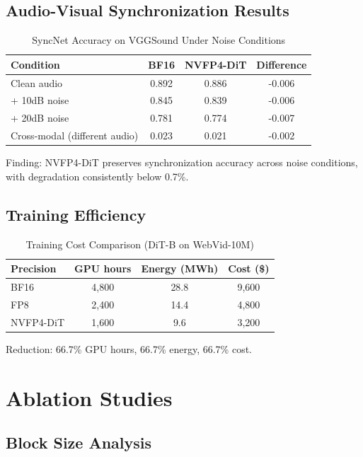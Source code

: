 \documentclass[journal]{IEEEtran}
\theoremstyle{definition}
\theoremstyle{remark}
\begin{document}
\subsection{Audio-Visual Synchronization Results}

\begin{table}[h]
\centering
\caption{SyncNet Accuracy on VGGSound Under Noise Conditions}
\label{tab:syncnet}
\begin{tabular}{lccc}
\toprule
Condition & BF16 & NVFP4-DiT & Difference \\
\midrule
Clean audio & 0.892 & 0.886 & -0.006 \\
+ 10dB noise & 0.845 & 0.839 & -0.006 \\
+ 20dB noise & 0.781 & 0.774 & -0.007 \\
Cross-modal (different audio) & 0.023 & 0.021 & -0.002 \\
\bottomrule
\end{tabular}
\end{table}

Finding: NVFP4-DiT preserves synchronization accuracy across noise conditions, with degradation consistently below 0.7\%.

\subsection{Training Efficiency}

\begin{table}[h]
\centering
\caption{Training Cost Comparison (DiT-B on WebVid-10M)}
\label{tab:training_cost}
\begin{tabular}{lccc}
\toprule
Precision & GPU hours & Energy (MWh) & Cost (\$) \\
\midrule
BF16 & 4,800 & 28.8 & 9,600 \\
FP8 & 2,400 & 14.4 & 4,800 \\
NVFP4-DiT & 1,600 & 9.6 & 3,200 \\
\bottomrule
\end{tabular}
\end{table}

Reduction: 66.7\% GPU hours, 66.7\% energy, 66.7\% cost.

\section{Ablation Studies}
\label{sec:ablation}

\subsection{Block Size Analysis}
\end{document}

